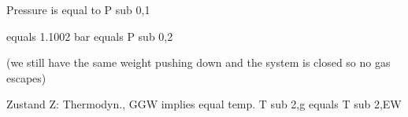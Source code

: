 Pressure is equal to P sub 0,1

equals 1.1002 bar equals P sub 0,2

(we still have the same weight pushing down and the system is closed so no gas escapes)

Zustand Z: Thermodyn., GGW implies equal temp. T sub 2,g equals T sub 2,EW